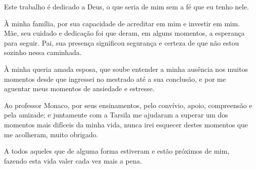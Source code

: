 Este trabalho é dedicado a Deus, o que seria de mim sem a fé que eu tenho nele.

À minha família, por sua capacidade de acreditar em mim e investir em mim. Mãe, seu cuidado e dedicação foi que deram, em alguns momentos, a esperança para seguir. Pai, sua presença significou segurança e certeza de que não estou sozinho nessa caminhada. 

À minha queria amada esposa, que soube entender a minha ausência nos muitos momentos desde que ingressei no mestrado até a sua conclusão, e por me aguentar meus momentos de ansiedade e estresse.

Ao professor Monaco, por seus ensinamentos, pelo convívio, apoio, compreensão e pela amizade; e juntamente com a Tarsila me ajudaram a superar um dos momentos mais difíceis da minha vida, nunca irei esquecer destes momentos que me acolheram, muito obrigado.

A todos aqueles que de alguma forma estiveram e estão próximos de mim, fazendo esta vida valer cada vez mais a pena.